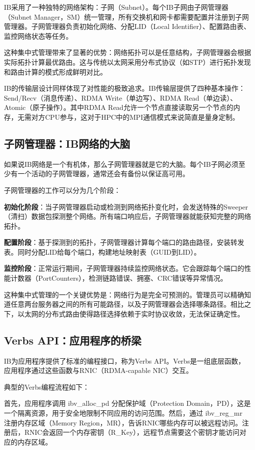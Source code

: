 IB采用了一种独特的网络架构：子网（Subnet）。每个IB子网由子网管理器（Subnet Manager，SM）统一管理，所有交换机和网卡都需要配置并注册到子网管理器。子网管理器负责初始化网络、分配LID（Local Identifier）、配置路由表、监控网络状态等任务。

这种集中式管理带来了显著的优势：网络拓扑可以是任意结构，子网管理器会根据实际拓扑计算最优路由。这与传统以太网采用分布式协议（如STP）进行拓扑发现和路由计算的模式形成鲜明对比。

IB的传输层设计同样体现了对性能的极致追求。IB传输层提供了四种基本操作：Send/Recv（消息传递）、RDMA Write（单边写）、RDMA Read（单边读）、Atomic（原子操作）。其中RDMA Read允许一个节点直接读取另一个节点的内存，无需对方CPU参与，这对于HPC中的MPI通信模式来说简直是量身定制。

\subsection{子网管理器：IB网络的大脑}

如果说IB网络是一个有机体，那么子网管理器就是它的大脑。每个IB子网必须至少有一个活动的子网管理器，通常还会有备份以保证高可用。

子网管理器的工作可以分为几个阶段：

\textbf{初始化阶段}：当子网管理器启动或检测到网络拓扑变化时，会发送特殊的Sweeper（清扫）数据包探测整个网络。所有端口响应后，子网管理器就能获知完整的网络拓扑。

\textbf{配置阶段}：基于探测到的拓扑，子网管理器计算每个端口的路由路径，安装转发表。同时分配LID给每个端口，构建地址映射表（GUID到LID）。

\textbf{监控阶段}：正常运行期间，子网管理器持续监控网络状态。它会跟踪每个端口的性能计数器（PortCounters），检测链路错误、拥塞、CRC错误等异常情况。

这种集中式管理的一个关键优势是：网络行为是完全可预测的。管理员可以精确知道任意两台服务器之间的所有可能路径，以及子网管理器会选择哪条路径。相比之下，以太网的分布式路由使得路径选择依赖于实时协议收敛，无法保证确定性。

\subsection{Verbs API：应用程序的桥梁}

IB为应用程序提供了标准的编程接口，称为Verbs API。Verbs是一组底层函数，应用程序通过这些函数与RNIC（RDMA-capable NIC）交互。

典型的Verbs编程流程如下：

首先，应用程序调用 ibv\_alloc\_pd 分配保护域（Protection Domain，PD），这是一个隔离资源，用于安全地限制不同应用的访问范围。然后，通过 ibv\_reg\_mr 注册内存区域（Memory Region，MR），告诉RNIC哪些内存可以被远程访问。注册后，RNIC会返回一个内存密钥（R\_Key），远程节点需要这个密钥才能访问对应的内存区域。


